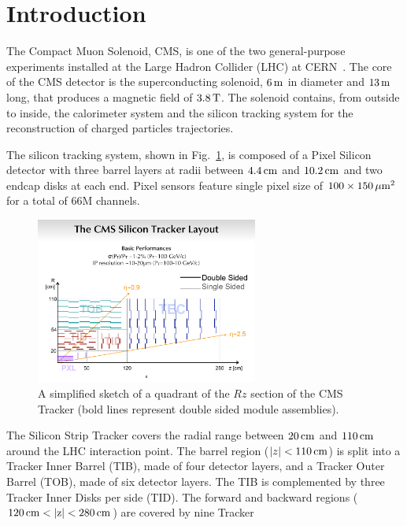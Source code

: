 \section{Introduction}
\label{introduction}

The Compact Muon Solenoid, CMS, is one of the two general-purpose
experiments installed at the Large Hadron Collider (LHC) at
CERN~\cite{cms}. The core of the CMS detector is
the superconducting solenoid, $6\rm \, m$ in diameter and $13\rm \, m$ long, that
produces a magnetic field of $3.8\rm \, T$. The solenoid contains, from
outside to inside, the calorimeter system and the silicon 
tracking system for the reconstruction of charged particles
trajectories.
 
The silicon tracking system, shown in Fig.~\ref{fig:tracker}, is composed of a Pixel
Silicon detector with three barrel layers at radii between $4.4\rm \, cm$
and $10.2\rm \, cm$ and two endcap disks at each end. Pixel sensors feature single pixel size
of $100\times150\, \mu \rm m^2$ for a total of 66M channels.  
\begin{figure}[t]
\begin{center}
\includegraphics*[width=0.65\textwidth]{figs/layout_rz.pdf}
\caption{A simplified sketch of a quadrant
of the $Rz$ section of the CMS Tracker (bold lines
represent double sided module assemblies).}
\label{fig:tracker}
\end{center}
\end{figure}
The Silicon Strip Tracker
covers the radial range between $20\rm \, cm$ and $110\rm \, cm$ around the LHC
interaction point. The barrel region ($| z |  < 110\rm \, cm$) is split into
a Tracker Inner Barrel (TIB), made of four detector layers, and a
Tracker Outer Barrel (TOB), made of six detector layers. The TIB is
complemented by three Tracker Inner Disks 
per side (TID). The forward and backward
regions ($120\rm \, cm < |z| < 280\rm \, cm$) are covered by nine Tracker
